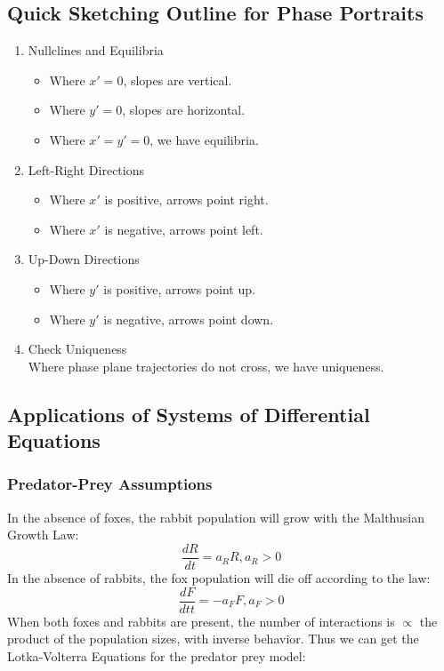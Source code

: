     \subsection{Quick Sketching Outline for Phase Portraits}
    \begin{enumerate}
    \item Nullclines and Equilibria
        \begin{itemize}
        \item Where $x\prime = 0$, slopes are vertical.
        \item Where $y\prime = 0$, slopes are horizontal.
        \item Where $x\prime = y\prime = 0$, we have equilibria.
        \end{itemize}
    \item Left-Right Directions
        \begin{itemize}
        \item Where $x\prime$ is positive, arrows point right.
        \item Where $x\prime$ is negative, arrows point left.
        \end{itemize}
    \item Up-Down Directions
        \begin{itemize}
        \item Where $y\prime$ is positive, arrows point up.
        \item Where $y\prime$ is negative, arrows point down.
        \end{itemize}
    \item Check Uniqueness\\
    Where phase plane trajectories do not cross, we have uniqueness.
    \end{enumerate}

    \subsection{Applications of Systems of Differential Equations}
        \subsubsection{Predator-Prey Assumptions}
        In the absence of foxes, the rabbit population will grow with the Malthusian Growth Law:
        \[
        \frac{dR}{dt} = a_R R, a_R > 0
        \]
        In the absence of rabbits, the fox population will die off according to the law:
        \[
        \frac{dF}{dtt} = -a_F F, a_F > 0
        \]
        When both foxes and rabbits are present, the number of interactions is $\propto$ the product of the population sizes, with inverse behavior. Thus we can get the Lotka-Volterra Equations for the predator prey model:


